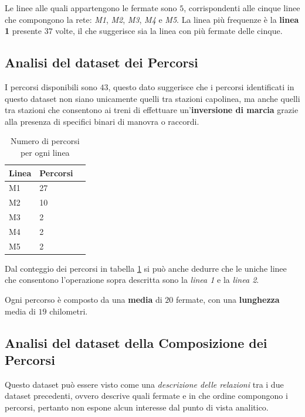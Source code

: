 Le linee alle quali appartengono le fermate sono $5$, corrispondenti alle cinque linee che compongono la rete: \textit{M1}, \textit{M2}, \textit{M3}, \textit{M4} e \textit{M5}. La linea più frequenze è la \textbf{linea 1} presente $37$ volte,  il che suggerisce sia la linea con più fermate delle cinque.

\subsection{Analisi del dataset dei Percorsi}
I percorsi disponibili sono $43$, questo dato suggerisce che i percorsi identificati in questo dataset non siano unicamente quelli tra stazioni capolinea, ma anche quelli tra stazioni che consentono ai treni di effettuare un'\textbf{inversione di marcia} grazie alla presenza di specifici binari di manovra o raccordi.

\vspace{1.5em}
\begin{table}[h!]
\centering
\begin{tabular}{lll}
\hline
\textbf{Linea} & \textbf{Percorsi} \\
\hline
M1 & 27 \\
M2 & 10 \\
M3 & 2 \\
M4 & 2 \\
M5 & 2 \\
\hline
\end{tabular}
\caption{Numero di percorsi per ogni linea}
\label{tab:Numero di percorsi per ogni linea}
\end{table}
\vspace{1.5em}

Dal conteggio dei percorsi in tabella \ref{tab:Numero di percorsi per ogni linea} si può anche dedurre che le uniche linee che consentono l'operazione sopra descritta sono la \textit{linea 1} e la \textit{linea 2}.

Ogni percorso è composto da una \textbf{media} di $20$ fermate, con una \textbf{lunghezza} media di $19$ chilometri.

\subsection{Analisi del dataset della Composizione dei Percorsi}
Questo dataset può essere visto come una \textit{descrizione delle relazioni} tra i due dataset precedenti, ovvero descrive quali fermate e in che ordine compongono i percorsi, pertanto non espone alcun interesse dal punto di vista analitico.

